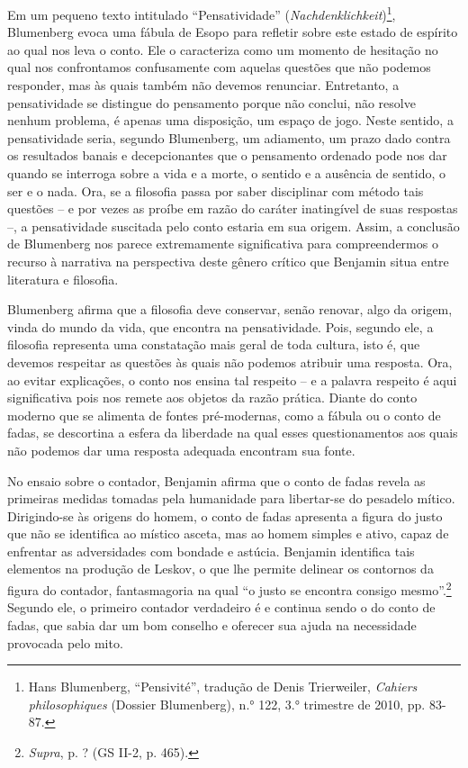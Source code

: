 Em um pequeno texto intitulado ``Pensatividade''
(\emph{Nachdenklichkeit})\footnote{Hans Blumenberg, ``Pensivité'',
  tradução de Denis Trierweiler, \emph{Cahiers philosophiques} (Dossier
  Blumenberg), n.° 122, 3.° trimestre de 2010, pp. 83-87.}, Blumenberg
evoca uma fábula de Esopo para refletir sobre este estado de espírito ao
qual nos leva o conto. Ele o caracteriza como um momento de hesitação no
qual nos confrontamos confusamente com aquelas questões que não podemos
responder, mas às quais também não devemos renunciar. Entretanto, a
pensatividade se distingue do pensamento porque não conclui, não resolve
nenhum problema, é apenas uma disposição, um espaço de jogo. Neste
sentido, a pensatividade seria, segundo Blumenberg, um adiamento, um
prazo dado contra os resultados banais e decepcionantes que o pensamento
ordenado pode nos dar quando se interroga sobre a vida e a morte, o
sentido e a ausência de sentido, o ser e o nada. Ora, se a filosofia
passa por saber disciplinar com método tais questões -- e por vezes as
proíbe em razão do caráter inatingível de suas respostas --, a
pensatividade suscitada pelo conto estaria em sua origem. Assim, a
conclusão de Blumenberg nos parece extremamente significativa para
compreendermos o recurso à narrativa na perspectiva deste gênero crítico
que Benjamin situa entre literatura e filosofia.

Blumenberg afirma que a filosofia deve conservar, senão renovar, algo da
origem, vinda do mundo da vida, que encontra na pensatividade. Pois,
segundo ele, a filosofia representa uma constatação mais geral de toda
cultura, isto é, que devemos respeitar as questões às quais não podemos
atribuir uma resposta. Ora, ao evitar explicações, o conto nos ensina
tal respeito -- e a palavra respeito é aqui significativa pois nos
remete aos objetos da razão prática. Diante do conto moderno que se
alimenta de fontes pré-modernas, como a fábula ou o conto de fadas, se
descortina a esfera da liberdade na qual esses questionamentos aos quais
não podemos dar uma resposta adequada encontram sua fonte.

No ensaio sobre o contador, Benjamin afirma que o conto de fadas revela
as primeiras medidas tomadas pela humanidade para libertar-se do
pesadelo mítico. Dirigindo-se às origens do homem, o conto de fadas
apresenta a figura do justo que não se identifica ao místico asceta, mas
ao homem simples e ativo, capaz de enfrentar as adversidades com bondade
e astúcia. Benjamin identifica tais elementos na produção de Leskov, o
que lhe permite delinear os contornos da figura do contador,
fantasmagoria na qual ``o justo se encontra consigo mesmo''.\footnote{\emph{Supra},
  p. ? (GS II-2, p. 465).} Segundo ele, o primeiro contador verdadeiro é
e continua sendo o do conto de fadas, que sabia dar um bom conselho e
oferecer sua ajuda na necessidade provocada pelo mito.

